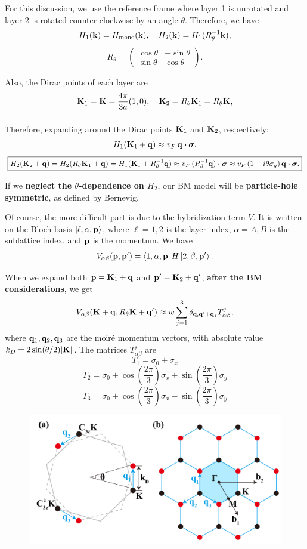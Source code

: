 \documentclass[12pt]{report}
\begin{document}
\n

For this discussion, we use the reference frame where layer 1 is unrotated and layer 2 is rotated counter-clockwise by an angle $\theta$. Therefore, we have
$$
H_1({\vb{k}}) = H_{\text{mono}}({\vb{k}}), \quad H_2({\vb{k}}) = H_1(R_\theta^{-1}{\vb{k}}),
$$
$$
R_\theta =
\begin{pmatrix}
\cos\theta & -\sin\theta \\
\sin\theta & \cos\theta
\end{pmatrix}.
$$

Also, the Dirac points of each layer are
$$
{\vb{K}}_1 = {\vb{K}} = \frac{4\pi}{3a} (1, 0), \quad {\vb{K}}_2 = R_\theta {\vb{K}}_1 = R_\theta {\vb{K}},
$$
$$
$$

Therefore, expanding around the Dirac points ${\vb{K}}_1$ and ${\vb{K}}_2$, respectively:
$$
H_1(\K_1 + \q) \approx v_F \, \q \vdot \bm{\sigma}.
$$
$$
\boxed{ H_2(\K_2 + \q) = H_2(R_\theta \K_1 + \q) = H_1(\K_1 + R_\theta^{-1}\q) \approx v_F \, (R_\theta^{-1}\q) \vdot \bm{\sigma} \approx v_F \, (1 - i \theta \sigma_y ) \, \q \vdot \bm{\sigma}. }
$$

If we \textbf{neglect the $\theta$-dependence on $H_2$}, our BM model will be \textbf{particle-hole symmetric}, as defined by Bernevig.

\n

Of course, the more difficult part is due to the hybridization term $V$. It is written on the Bloch basis $\ket{\ell, \alpha, {\vb{p}}}$, where $\ell = 1, 2$ is the layer index, $\alpha = A, B$ is the sublattice index, and ${\vb{p}}$ is the momentum.
We have
$$
V_{\alpha\beta}({\vb{p}}, {\vb{p}}') = \bra{1, \alpha, {\vb{p}}} H \ket{2, \beta, {\vb{p}}'}.
$$

When we expand both ${\vb{p}} = {\vb{K}}_1 + {\vb{q}}$ and ${\vb{p}}' = {\vb{K}}_2 + {\vb{q}}'$, \textbf{after the BM considerations}, we get
$$
V_{\alpha\beta}({\vb{K}} + {\vb{q}}, R_\theta {\vb{K}} + {\vb{q}}') \approx
w \sum_{j=1}^{3} \delta_{{\vb{q}}, {\vb{q}}' + {\vb{q}}_j} T_{\alpha\beta}^j,
$$
where ${\vb{q}}_1, {\vb{q}}_2, {\vb{q}}_3$ are the moiré momentum vectors, with absolute value $k_D = 2 \sin(\theta/2) \abs{{\vb{K}}}$. The matrices $T^j_{\alpha\beta}$ are
$$
T_1 = \sigma_0 + \sigma_x
$$
$$
T_2 = \sigma_0 + \cos(\frac{2\pi}{3}) \sigma_x + \sin(\frac{2\pi}{3}) \sigma_y
$$
$$
T_3 = \sigma_0 + \cos(\frac{2\pi}{3}) \sigma_x - \sin(\frac{2\pi}{3}) \sigma_y
$$
\begin{figure}[H]
\centering
\includegraphics[width=0.8\linewidth]{fig/moire-vectors.png}
\end{figure}
\end{document}
